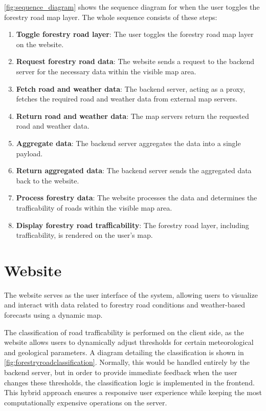 \autoref{fig:sequence_diagram} shows the sequence diagram for when the user toggles the forestry road map layer. The whole sequence consists of these steps:

\begin{enumerate}
    \item \textbf{Toggle forestry road layer}: The user toggles the forestry road map layer on the website.
    \item \textbf{Request forestry road data}: The website sends a request to the backend server for the necessary data within the visible map area.
    \item \textbf{Fetch road and weather data}: The backend server, acting as a proxy, fetches the required road and weather data from external map servers.
    \item \textbf{Return road and weather data}: The map servers return the requested road and weather data.
    \item \textbf{Aggregate data}: The backend server aggregates the data into a single payload.
    \item \textbf{Return aggregated data}: The backend server sends the aggregated data back to the website.
    \item \textbf{Process forestry data}: The website processes the data and determines the trafficability of roads within the visible map area.
    \item \textbf{Display forestry road trafficability}: The forestry road layer, including trafficability, is rendered on the user's map.
\end{enumerate}

\section{Website}\label{sec:technicaldesign:website}

The website serves as the user interface of the system, allowing users to visualize and interact with data related to forestry road conditions and weather-based forecasts using a dynamic map.

The classification of road trafficability is performed on the client side, as the website allows users to dynamically adjust thresholds for certain meteorological and geological parameters. A diagram detailing the classification is shown in \autoref{fig:forestryroadclassification}. Normally, this would be handled entirely by the backend server, but in order to provide immediate feedback when the user changes these thresholds, the classification logic is implemented in the frontend. This hybrid approach ensures a responsive user experience while keeping the most computationally expensive operations on the server.

